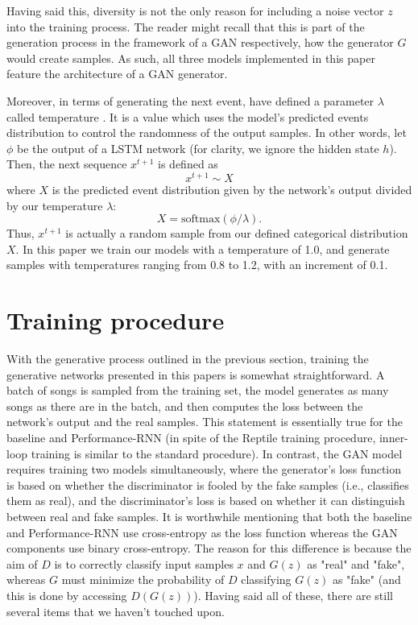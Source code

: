 \documentclass[a4paper]{book}
\begin{document}
Having said this, diversity is not the only reason for including a noise vector $z$ into the training process. The reader might recall that this is part of the generation process in the framework of a GAN respectively, how the generator $G$ would create samples. As such, all three models implemented in this paper feature the architecture of a GAN generator.

Moreover, in terms of generating the next event, \textcite{oore_this_2018} have defined a parameter $\lambda$ called temperature \parencite{google_magenta_performance_2017}. It is a value which uses the model's predicted events distribution to control the randomness of the output samples. In other words, let $\phi$ be the output of a LSTM network (for clarity, we ignore the hidden state $h$). Then, the next sequence $x^{t+1}$ is defined as 
\begin{equation}
    x^{t+1} \sim X
\end{equation}
where $X$ is the predicted event distribution given by the network's output divided by our temperature $\lambda$:
\begin{equation}
    X = \text{softmax}(\phi / \lambda).
\end{equation}
Thus, $x^{t+1}$ is actually a random sample from our defined categorical distribution $X$. In this paper we train our models with a temperature of 1.0, and generate samples with temperatures ranging from 0.8 to 1.2, with an increment of 0.1.

\section{Training procedure} \label{sec:reptile_train}

With the generative process outlined in the previous section, training the generative networks presented in this papers is somewhat straightforward. A batch of songs is sampled from the training set, the model generates as many songs as there are in the batch, and then computes the loss between the network's output and the real samples. This statement is essentially true for the baseline and Performance-RNN (in spite of the Reptile training procedure, inner-loop training is similar to the standard procedure). In contrast, the GAN model requires training two models simultaneously, where the generator's loss function is based on whether the discriminator is fooled by the fake samples (i.e., classifies them as real), and the discriminator's loss is based on whether it can distinguish between real and fake samples. It is worthwhile mentioning that both the baseline and Performance-RNN use cross-entropy as the loss function whereas the GAN components use binary cross-entropy. The reason for this difference is because the aim of $D$ is to correctly classify input samples $x$ and $G(z)$ as "real" and "fake", whereas $G$ must minimize the probability of $D$ classifying $G(z)$ as "fake" (and this is done by accessing $D(G(z))$). Having said all of these, there are still several items that we haven't touched upon.
\end{document}
